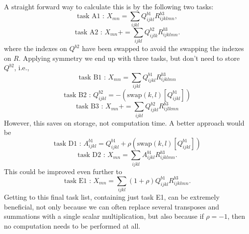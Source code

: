 \noindent A straight forward way to calculate this is by the following two tasks:
\begin{equation*}
\text{task A1\ : \ \ \  \ } X_{mn} = \sum_{ijkl}  Q^{b1}_{ijkl}R^{b3}_{ijklmn},
\end{equation*}                                                             
\begin{equation*}                                                           
\text{task A2\ : \ \ \  \ } X_{mn} += \sum_{ijkl} Q^{b2}_{ijlk}R^{b3}_{ijklmn}.
\end{equation*}
where the indexes on $Q^{b2}$ have been swapped to avoid the swapping the indexes on $R$.
Applying symmetry we end up with three tasks, but don't need to store $Q^{b2}$, i.e., 
\begin{equation*}
\text{task B1\ : \ \ \  \ } X_{mn} = \sum_{ijkl}  Q^{b1}_{ijkl}R^{b3}_{ijklmn}
\end{equation*}                                                             
\begin{equation*}                                                           
\text{task B2\ : \ \ \  \ } Q^{b2}_{ijkl} = - (\text{swap}(k,l)[ Q^{b1}_{ijkl}])
\end{equation*}
\begin{equation*}                                                           
\text{task B3\ : \ \ \  \ } X_{mn} += \sum_{ijkl} Q^{b2}_{ijkl}R^{b3}_{ijlkmn}
\end{equation*}
However, this saves on storage, not computation time. A better approach would be
\begin{equation*}                                                           
\text{task D1\ : \ \ \  \ } A^{b1}_{ijkl} =  Q^{b1}_{ijkl} + \rho(\text{swap}(k,l)[Q^{b1}_{ijkl}] ) 
\end{equation*}
\begin{equation*}                                                           
\text{task D2\ : \ \ \  \ } X_{mn} = \sum_{ijkl} A^{b1}_{ijkl}R^{b3}_{ijklmn}.
\end{equation*}
This could be improved even further to
\begin{equation*}                                                           
\text{task E1\ : \ \ \  \ } X_{mn} = \sum_{ijkl} (1+\rho) Q^{b1}_{ijkl}R^{b3}_{ijklmn}.
\end{equation*}
\noindent Getting to this final task list, containing just task E1, can be
extremely beneficial, not only because we can often replace several transposes
and summations with a single scalar multiplication, but also because if $\rho =
-1$, then no computation needs to be performed at all.\\  

